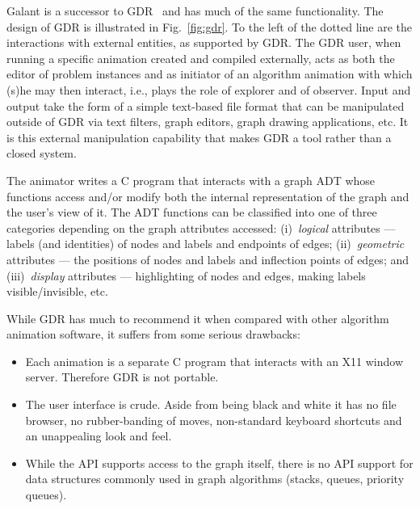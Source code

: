 Galant is a successor to
GDR~\cite{1991-TR_NCSU_CSC-Stallmann,1992-CSDM-Stallmann} and has much of the
same functionality.
The design of GDR is illustrated in Fig.~\ref{fig:gdr}.
To the left of the dotted line are the interactions with external entities,
as supported by GDR.
The GDR user, when running a specific animation created and compiled
externally, acts as both the editor of problem instances and as initiator of an
algorithm animation with which (s)he may then interact, i.e., plays the role
of explorer and of observer. 
Input and output take the form of a simple text-based file format that can be
manipulated outside of GDR via text filters, graph editors, graph drawing
applications, etc. It is this external manipulation capability
that makes GDR a tool rather than a
closed system.

The animator writes a C program that interacts with a graph ADT
whose functions access and/or modify both the internal representation of the
graph and the user's view of it. The ADT functions can be classified into one
of three categories depending on the graph attributes accessed:
(i)~\emph{logical} attributes --- labels (and identities) of nodes and labels
and endpoints of edges; (ii)~\emph{geometric} attributes --- the positions of
nodes and labels and
inflection points of edges; and (iii)~\emph{display} attributes ---
highlighting of nodes and edges, making labels visible/invisible, etc. 

While GDR has much to recommend it when compared with other algorithm
animation software, it suffers from some serious drawbacks:

\begin{itemize}
\item
  Each animation is a separate C program that interacts with an X11 window
  server.
  Therefore GDR is not portable.
\item
  The user interface is crude. Aside from being black and white it has no
  file browser, no rubber-banding of moves, non-standard keyboard shortcuts
  and an unappealing look and feel.
\item
  While the API supports access to the graph itself, there is no API support for
  data structures commonly used in graph algorithms (stacks, queues, priority
  queues).
\end{itemize}

